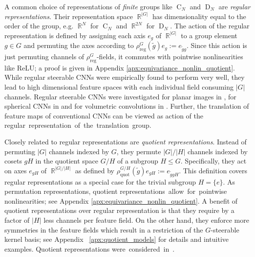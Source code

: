 \documentclass{article}
\newcommand{\apx}{Appendix\xspace
}
\DeclareMathOperator*{\R}{\mathbb{R}}
\newcommand{\DN}{\ensuremath{\operatorname{D}_{\!N}}}
\newcommand{\CN}{\ensuremath{\operatorname{C}_{\!N}}}
\begin{document}
A common choice of representations of \emph{finite} groups like $\CN$ and $\DN$ are \emph{regular representations}.
Their representation space $\R^{|G|}$ has dimensionality equal to the order of the group, e.g. $\R^N$ for $\CN$ and $\R^{2N}$ for $\DN$.
The action of the regular representation is defined by assigning each axis $e_g$ of $\R^{|G|}$ to a group element $g\in G$ and permuting the axes according to
$\rho_\text{reg}^G(\tilde{g}) e_g := e_{\tilde{g}g}$.
Since this action is just permuting channels of $\rho_\text{reg}^G$-fields, it commutes with pointwise nonlinearities like ReLU; a proof is given in \apx \ref{apx:equivariance_nonlin_quotient}.
While regular steerable CNNs were empirically found to perform very well, they lead to high dimensional feature spaces with each individual field consuming $|G|$ channels.
Regular steerable CNNs were investigated for planar images in \cite{Cohen2016-GCNN,Weiler2018-STEERABLE,Hoogeboom2018-HEX,bekkers2018roto,Dieleman2016-CYC,sifre2014rigid,oyallonDeepRotoTranslationScattering2015,diaconu2019learning}, for spherical CNNs in \cite{Cohen2018-S2CNN,gauge} and for volumetric convolutions in \cite{winkels3DGCNNsPulmonary2018,Worrall2018-CUBENET}.
Further, the translation of feature maps of conventional CNNs can be viewed as action of the regular~representation~of~the~translation~group.

Closely related to regular representations are \emph{quotient representations}.
Instead of permuting $|G|$ channels indexed by $G$, they permute $|G|/|H|$ channels indexed by cosets $gH$ in the quotient space $G/H$ of a subgroup $H\leq G$.
Specifically, they act on axes $e_{gH}$ of $\R^{|G|/|H|}$ as defined by $\rho_\text{quot}^{G/H}(\tilde{g})e_{gH}:=e_{\tilde{g}gH}$.
This definition covers regular representations as a special case for the trivial subgroup $H=\{e\}$.
As permutation representations, quotient representations~allow~for~pointwise nonlinearities; see \apx \ref{apx:equivariance_nonlin_quotient}.
A benefit of quotient representations over regular representation is that they require by a factor of $|H|$ less channels per feature field.
On the other hand, they enforce more symmetries in the feature fields which result in a restriction of the $G$-steerable kernel basis; see \apx~\ref{apx:quotient_models} for details and intuitive examples.
Quotient representations were~considered~in~\cite{Cohen2017-STEER,Kondor2018-GENERAL}.
\end{document}
